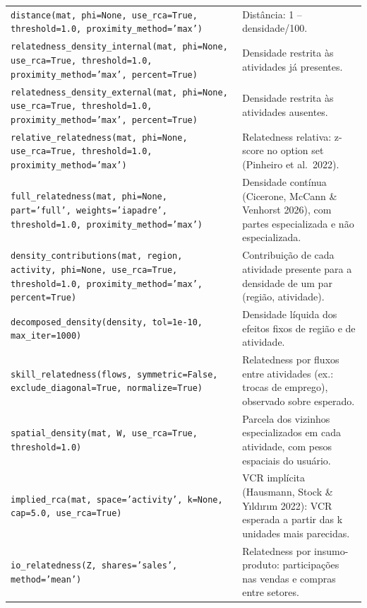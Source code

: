 \begin{longtable}{>{\raggedright\arraybackslash}p{9.2cm} >{\raggedright\arraybackslash}p{7.0cm}}
\texttt{\footnotesize distance(mat, phi=None, use\_rca=True, threshold=1.0, proximity\_method='max')} & {\small Dist\^{a}ncia: 1 -- densidade/100.} \\[2pt]
\texttt{\footnotesize relatedness\_density\_internal(mat, phi=None, use\_rca=True, threshold=1.0, proximity\_method='max', percent=True)} & {\small Densidade restrita \`{a}s atividades j\'{a} presentes.} \\[2pt]
\texttt{\footnotesize relatedness\_density\_external(mat, phi=None, use\_rca=True, threshold=1.0, proximity\_method='max', percent=True)} & {\small Densidade restrita \`{a}s atividades ausentes.} \\[2pt]
\texttt{\footnotesize relative\_relatedness(mat, phi=None, use\_rca=True, threshold=1.0, proximity\_method='max')} & {\small Relatedness relativa: z-score no option set (Pinheiro et al.\ 2022).} \\[2pt]
\texttt{\footnotesize full\_relatedness(mat, phi=None, part='full', weights='iapadre', threshold=1.0, proximity\_method='max')} & {\small Densidade cont\'{i}nua (Cicerone, McCann \& Venhorst 2026), com partes especializada e n\~{a}o especializada.} \\[2pt]
\texttt{\footnotesize density\_contributions(mat, region, activity, phi=None, use\_rca=True, threshold=1.0, proximity\_method='max', percent=True)} & {\small Contribui\c{c}\~{a}o de cada atividade presente para a densidade de um par (regi\~{a}o, atividade).} \\[2pt]
\texttt{\footnotesize decomposed\_density(density, tol=1e-10, max\_iter=1000)} & {\small Densidade l\'{i}quida dos efeitos fixos de regi\~{a}o e de atividade.} \\[2pt]
\texttt{\footnotesize skill\_relatedness(flows, symmetric=False, exclude\_diagonal=True, normalize=True)} & {\small Relatedness por fluxos entre atividades (ex.: trocas de emprego), observado sobre esperado.} \\[2pt]
\texttt{\footnotesize spatial\_density(mat, W, use\_rca=True, threshold=1.0)} & {\small Parcela dos vizinhos especializados em cada atividade, com pesos espaciais do usu\'{a}rio.} \\[2pt]
\texttt{\footnotesize implied\_rca(mat, space='activity', k=None, cap=5.0, use\_rca=True)} & {\small VCR impl\'{i}cita (Hausmann, Stock \& Y{\i}ld{\i}r{\i}m 2022): VCR esperada a partir das k unidades mais parecidas.} \\[2pt]
\texttt{\footnotesize io\_relatedness(Z, shares='sales', method='mean')} & {\small Relatedness por insumo-produto: participa\c{c}\~{o}es nas vendas e compras entre setores.} \\[2pt]

\end{longtable}
